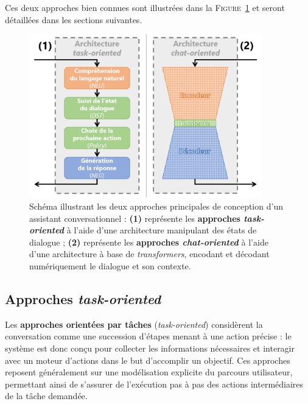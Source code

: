 		Ces deux approches bien connues sont illustrées dans la \textsc{Figure~\ref{figure:B.2-ANNEXE-CHATBOT-APPROCHES}} et seront détaillées dans les sections suivantes.
		\begin{figure}[H]
			\centering
			\includegraphics[width=0.90\textwidth]{figures/annexe-chatbots-architectures}
			\caption{
				Schéma illustrant les deux approches principales de conception d'un assistant conversationnel :
				\textbf{(1)} représente les \textbf{approches \textit{task-oriented}} à l'aide d'une architecture manipulant des états de dialogue ;
				\textbf{(2)} représente les \textbf{approches \textit{chat-oriented}} à l'aide d'une architecture à base de \textit{transformers}, encodant et décodant numériquement le dialogue et son contexte.
			}
			\label{figure:B.2-ANNEXE-CHATBOT-APPROCHES}
		\end{figure}
		
		
		\newpage
		\subsection{Approches \textit{task-oriented}}
		\label{annex:B.2.1-ANNEXE-CHATBOTS-APPROCHES-TASK-ORIENTED}
		
			Les \textbf{approches orientées par tâches} (\textit{task-oriented}) considèrent la conversation comme une succession d'étapes menant à une action précise : le système est donc conçu pour collecter les informations nécessaires et interagir avec un moteur d'actions dans le but d'accomplir un objectif.
			Ces approches reposent généralement sur une modélisation explicite du parcours utilisateur, permettant ainsi de s'assurer de l'exécution pas à pas des actions intermédiaires de la tâche demandée.
			

